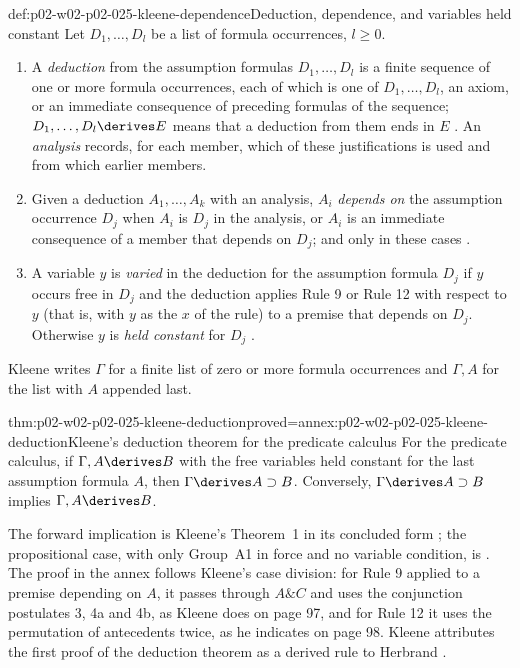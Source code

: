 \begin{hbdefinition}{def:p02-w02-p02-025-kleene-dependence}{Deduction, dependence, and variables held constant}
Let \(D_1,\ldots,D_l\) be a list of formula occurrences, \(l\geq 0\).
\begin{enumerate}
  \item A \emph{deduction} from the assumption formulas \(D_1,\ldots,D_l\) is
        a finite sequence of one or more formula occurrences, each of which
        is one of \(D_1,\ldots,D_l\), an axiom, or an immediate consequence
        of preceding formulas of the sequence; \(D_1,\ldots,D_l\derives E\)
        means that a deduction from them ends in \(E\)
        \cite[\S 20, p.~87]{Kleene1952}.  An \emph{analysis} records, for each
        member, which of these justifications is used and from which earlier
        members.
  \item Given a deduction \(A_1,\ldots,A_k\) with an analysis,
        \(A_i\) \emph{depends on} the assumption occurrence \(D_j\) when
        \(A_i\) is \(D_j\) in the analysis, or \(A_i\) is an immediate
        consequence of a member that depends on \(D_j\); and only in these
        cases \cite[\S 22, p.~95]{Kleene1952}.
  \item A variable \(y\) is \emph{varied} in the deduction for the assumption
        formula \(D_j\) if \(y\) occurs free in \(D_j\) and the deduction
        applies Rule 9 or Rule 12 with respect to \(y\) (that is, with \(y\) as
        the \(x\) of the rule) to a premise that depends on \(D_j\).
        Otherwise \(y\) is \emph{held constant} for \(D_j\)
        \cite[\S 22, pp.~95--96]{Kleene1952}.
\end{enumerate}
Kleene writes \(\Gamma\) for a finite list of zero or more formula
occurrences and \(\Gamma,A\) for the list with \(A\) appended last.
\end{hbdefinition}

\begin{hbtheorem}{thm:p02-w02-p02-025-kleene-deduction}{proved=annex:p02-w02-p02-025-kleene-deduction}{Kleene's deduction theorem for the predicate calculus}
For the predicate calculus, if \(\Gamma,A\derives B\) with the free variables
held constant for the last assumption formula \(A\), then
\(\Gamma\derives A\supset B\).  Conversely, \(\Gamma\derives A\supset B\)
implies \(\Gamma,A\derives B\).
\end{hbtheorem}

The forward implication is Kleene's Theorem~1 in its concluded form
\cite[\S 22, p.~97]{Kleene1952}; the propositional case, with only Group~A1
in force and no variable condition, is \cite[\S 21, p.~90]{Kleene1952}.  The
proof in the annex follows Kleene's case division: for Rule 9 applied to a
premise depending on \(A\), it passes through \(A\mathbin{\&}C\) and uses the
conjunction postulates 3, 4a and 4b, as Kleene does on page 97, and for
Rule 12 it uses the permutation of antecedents twice, as he indicates on
page 98.  Kleene attributes the first proof of the deduction theorem as a
derived rule to Herbrand \cite[\S 22, p.~98]{Kleene1952}.

